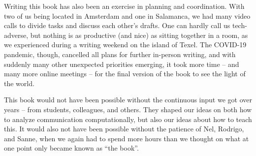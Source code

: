 Writing this book has also been an exercise in planning and coordination. With two of us being located in Amsterdam and one in Salamanca, we had many video calls to divide tasks and discuss each other's drafts. One can hardly call us tech-adverse, but nothing is as productive (and nice) as sitting together in a room, as we experienced during a writing weekend on the island of Texel.  The COVID-19 pandemic, though, cancelled all plans for further in-person writing, and with suddenly many other unexpected priorities emerging, it took more time -- and many more online meetings -- for the final version of the book to see the light of the world.

This book would not have been possible without the continuous input we got over years -- from students, colleagues, and others.  They shaped our ideas on both how to analyze communication computationally, but also our ideas about how to teach this. It would also not have been possible without the patience of Nel, Rodrigo, and Sanne, when we again had to spend more hours than we thought on what at one point only became known as ``the book''.


